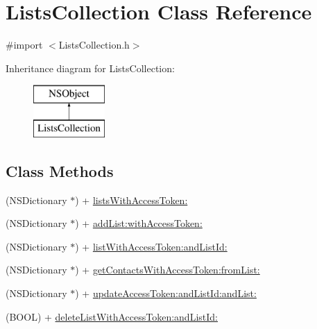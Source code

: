 \hypertarget{interface_lists_collection}{\section{Lists\-Collection Class Reference}
\label{interface_lists_collection}
}


{\ttfamily \#import $<$Lists\-Collection.\-h$>$}

Inheritance diagram for Lists\-Collection\-:\begin{figure}[H]
\begin{center}
\leavevmode
\includegraphics[height=2.000000cm]{interface_lists_collection}
\end{center}
\end{figure}
\subsection*{Class Methods}
\begin{DoxyCompactItemize}
\item 
(N\-S\-Dictionary $\ast$) + \hyperlink{interface_lists_collection_a1d59e04e11816254c3280befb94be15c}{lists\-With\-Access\-Token\-:}
\item 
(N\-S\-Dictionary $\ast$) + \hyperlink{interface_lists_collection_a9d2bb9fc392b0c4a1445a9ebac3777c2}{add\-List\-:with\-Access\-Token\-:}
\item 
(N\-S\-Dictionary $\ast$) + \hyperlink{interface_lists_collection_a7e2ee804f245c4a2f5254f7c9337db1d}{list\-With\-Access\-Token\-:and\-List\-Id\-:}
\item 
(N\-S\-Dictionary $\ast$) + \hyperlink{interface_lists_collection_ae0748049c69183491b6e91fa9251789a}{get\-Contacts\-With\-Access\-Token\-:from\-List\-:}
\item 
(N\-S\-Dictionary $\ast$) + \hyperlink{interface_lists_collection_a3e4b6508bb1ca2b8960db6f533dbf118}{update\-Access\-Token\-:and\-List\-Id\-:and\-List\-:}
\item 
(B\-O\-O\-L) + \hyperlink{interface_lists_collection_a84d4c02981fd98321417e2e35d9a14a6}{delete\-List\-With\-Access\-Token\-:and\-List\-Id\-:}
\end{DoxyCompactItemize}


